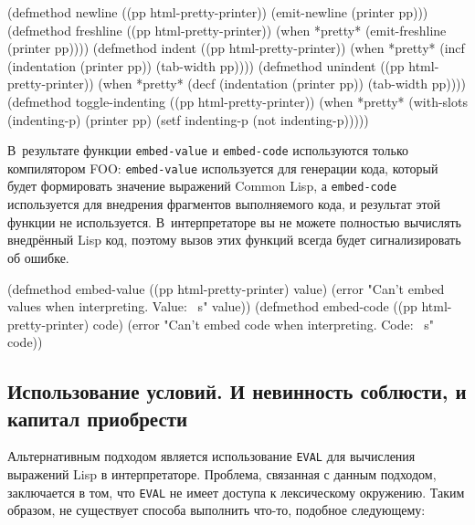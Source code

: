 \begin{myverb}
(defmethod newline ((pp html-pretty-printer))
  (emit-newline (printer pp)))
(defmethod freshline ((pp html-pretty-printer))
  (when *pretty* (emit-freshline (printer pp))))
(defmethod indent ((pp html-pretty-printer))
  (when *pretty* 
    (incf (indentation (printer pp)) (tab-width pp))))
(defmethod unindent ((pp html-pretty-printer))
  (when *pretty* 
    (decf (indentation (printer pp)) (tab-width pp))))
(defmethod toggle-indenting ((pp html-pretty-printer))
  (when *pretty* 
    (with-slots (indenting-p) (printer pp)
      (setf indenting-p (not indenting-p)))))
\end{myverb}

В~результате функции \lstinline{embed-value} и \lstinline{embed-code} используются только
компилятором FOO: \lstinline{embed-value} используется для генерации кода, который будет
формировать значение выражений Common Lisp, а \lstinline{embed-code} используется для
внедрения фрагментов выполняемого кода, и результат этой функции не используется.
В~интерпретаторе вы не можете полностью вычислять внедрённый Lisp код, поэтому вызов этих
функций всегда будет сигнализировать об ошибке.

\begin{myverb}
(defmethod embed-value ((pp html-pretty-printer) value)
  (error "Can't embed values when  interpreting. Value: ~s" value))
(defmethod embed-code ((pp html-pretty-printer) code)
  (error "Can't embed code when interpreting. Code: ~s" code))
\end{myverb}


\subsection[Использование условий. И невинность соблюсти, и капитал приобрести]{Использование условий. И невинность соблюсти, и капитал приобрести}

\small
Альтернативным подходом является использование \lstinline{EVAL} для вычисления
  выражений Lisp в интерпретаторе. Проблема, связанная с данным подходом, заключается в
  том, что \lstinline{EVAL} не имеет доступа к лексическому окружению. Таким образом, не
  существует способа выполнить что-то, подобное следующему:

